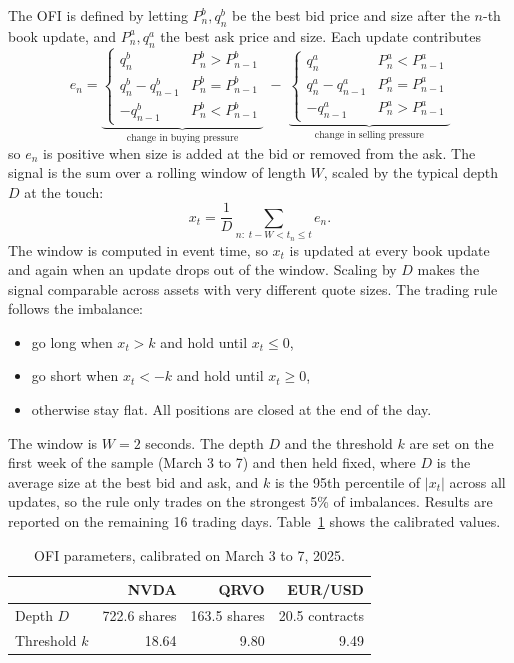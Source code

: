 \documentclass{article}
\begin{document}
\noindent The OFI is defined by letting $P^b_n, q^b_n$ be the best bid price and size after the $n$-th book update, and $P^a_n, q^a_n$ the best ask price and size. Each update contributes
\begin{equation}
e_n = \underbrace{\begin{cases} q^b_n & P^b_n > P^b_{n-1} \\ q^b_n - q^b_{n-1} & P^b_n = P^b_{n-1} \\ -q^b_{n-1} & P^b_n < P^b_{n-1} \end{cases}}_{\text{change in buying pressure}}
\;-\;
\underbrace{\begin{cases} q^a_n & P^a_n < P^a_{n-1} \\ q^a_n - q^a_{n-1} & P^a_n = P^a_{n-1} \\ -q^a_{n-1} & P^a_n > P^a_{n-1} \end{cases}}_{\text{change in selling pressure}}
\end{equation}
so $e_n$ is positive when size is added at the bid or removed from the ask. The signal is the sum over a rolling window of length $W$, scaled by the typical depth $D$ at the touch:
\begin{equation}
x_t = \frac{1}{D} \sum_{n:\; t - W < t_n \le t} e_n .
\end{equation}
The window is computed in event time, so $x_t$ is updated at every book update and again when an update drops out of the window. Scaling by $D$ makes the signal comparable across assets with very different quote sizes. The trading rule follows the imbalance:
\begin{itemize}
\item go long when $x_t > k$ and hold until $x_t \le 0$,
\item go short when $x_t < -k$ and hold until $x_t \ge 0$,
\item otherwise stay flat. All positions are closed at the end of the day.
\end{itemize}

\noindent The window is $W = 2$ seconds. The depth $D$ and the threshold $k$ are set on the first week of the sample (March 3 to 7) and then held fixed, where $D$ is the average size at the best bid and ask, and $k$ is the 95th percentile of $|x_t|$ across all updates, so the rule only trades on the strongest 5\% of imbalances. Results are reported on the remaining 16 trading days. Table~\ref{tab:ofi_params} shows the calibrated values.

\begin{table}[H]
\centering
\begin{tabular}{lrrr}
\hline
 & NVDA & QRVO & EUR/USD \\
\hline
Depth $D$ & 722.6 shares & 163.5 shares & 20.5 contracts \\
Threshold $k$ & 18.64 & 9.80 & 9.49 \\
\hline
\end{tabular}
\caption{OFI parameters, calibrated on March 3 to 7, 2025.}
\label{tab:ofi_params}
\end{table}
\end{document}

